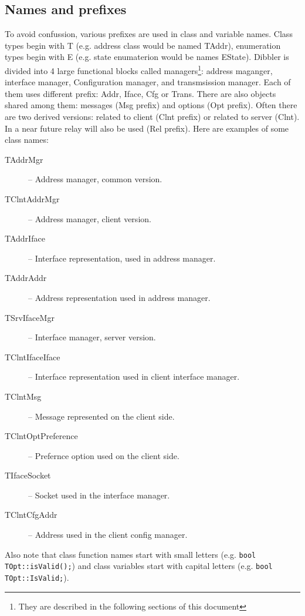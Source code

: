 \subsection{Names and prefixes}
To avoid confussion, various prefixes are used in class and variable
names. Class types begin with T (e.g. address class would be named
TAddr), enumeration types begin with E (e.g. state enumaterion would
be names EState). Dibbler is divided into 4 large functional blocks
called managers\footnote{They are described in the following sections
  of this document}: address maganger, interface manager, Configuration
manager, and transmsission manager. Each of them uses different
prefix: Addr, Iface, Cfg or Trans. There are also objects shared among
them: messages (Msg prefix) and options (Opt prefix). Often there are
two derived versions: related to client (Clnt prefix) or related to
server (Clnt). In a near future relay will also be used (Rel prefix). 
Here are examples of some class names:
\begin{description}
\item[TAddrMgr] -- Address manager, common version.
\item[TClntAddrMgr] -- Address manager, client version.
\item[TAddrIface] -- Interface representation, used in address manager.
\item[TAddrAddr] -- Address representation used in address manager.
\item[TSrvIfaceMgr] -- Interface manager, server version.
\item[TClntIfaceIface] -- Interface representation used in client
  interface manager.
\item[TClntMsg] -- Message represented on the client side.
\item[TClntOptPreference] -- Prefernce option used on the client side.
\item[TIfaceSocket] -- Socket used in the interface manager.
\item[TClntCfgAddr] -- Address used in the client config manager.
\end{description}

Also note that class function names start with small letters
(e.g. \verb+bool TOpt::isValid();+) and class variables start with capital
letters (e.g. \verb+bool TOpt::IsValid;+).

